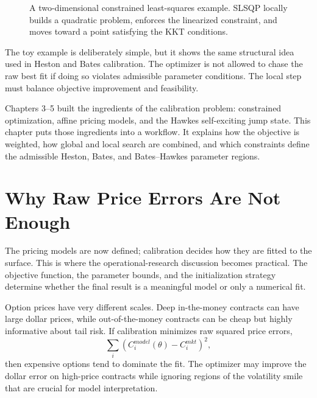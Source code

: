 \documentclass[a4paper,10pt,titlepage,oneside,openany]{book}
\theoremstyle{plain}
\theoremstyle{definition}
\theoremstyle{remark}
\begin{document}
\begin{figure}[H]
\centering
{}
\caption{A two-dimensional constrained least-squares example. SLSQP locally builds a quadratic problem, enforces the linearized constraint, and moves toward a point satisfying the KKT conditions.}
\label{fig:toy-slsqp}
\end{figure}

The toy example is deliberately simple, but it shows the same structural idea used in Heston and Bates calibration. The optimizer is not allowed to chase the raw best fit if doing so violates admissible parameter conditions. The local step must balance objective improvement and feasibility.


Chapters 3--5 built the ingredients of the calibration problem: constrained optimization, affine pricing models, and the Hawkes self-exciting jump state. This chapter puts those ingredients into a workflow. It explains how the objective is weighted, how global and local search are combined, and which constraints define the admissible Heston, Bates, and Bates--Hawkes parameter regions.

\section{Why Raw Price Errors Are Not Enough}

The pricing models are now defined; calibration decides how they are fitted to the surface. This is where the operational-research discussion becomes practical. The objective function, the parameter bounds, and the initialization strategy determine whether the final result is a meaningful model or only a numerical fit.

Option prices have very different scales. Deep in-the-money contracts can have large dollar prices, while out-of-the-money contracts can be cheap but highly informative about tail risk. If calibration minimizes raw squared price errors,
\[
    \sum_i \left(C_i^{model}(\theta)-C_i^{mkt}\right)^2,
\]
then expensive options tend to dominate the fit. The optimizer may improve the dollar error on high-price contracts while ignoring regions of the volatility smile that are crucial for model interpretation.
\end{document}
